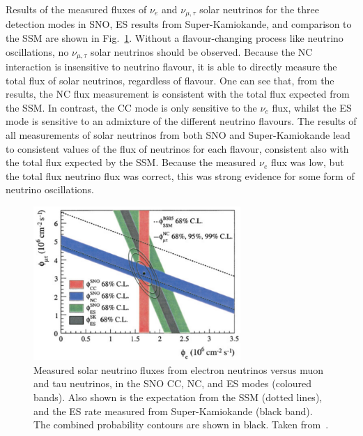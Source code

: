 Results of the measured fluxes of $\nu_{e}$ and $\nu_{\mu,\tau}$ solar neutrinos for the three detection modes in SNO, ES results from Super-Kamiokande, and comparison to the SSM are shown in Fig.~\ref{fig:sno_flux_results}. Without a flavour-changing process like neutrino oscillations, no $\nu_{\mu,\tau}$ solar neutrinos should be observed. Because the NC interaction is insensitive to neutrino flavour, it is able to directly measure the total flux of \beight{} solar neutrinos, regardless of flavour. One can see that, from the results, the NC flux measurement is consistent with the total flux expected from the SSM. In contrast, the CC mode is only sensitive to the $\nu_{e}$ flux, whilst the ES mode is sensitive to an admixture of the different neutrino flavours. The results of all measurements of solar neutrinos from both SNO and Super-Kamiokande lead to consistent values of the flux of \beight{} neutrinos for each flavour, consistent also with the total flux expected by the SSM. Because the measured $\nu_{e}$ flux was low, but the total flux neutrino flux was correct, this was strong evidence for some form of neutrino oscillations.

\begin{figure}
    \centering
    \includegraphics[width=0.7\textwidth]{1_NeutrinoTheory/Figs/sno_vs_ssm_comparison.png}
    \caption[Comparison of measured solar neutrino fluxes in the SNO CC, NC, and ES modes to the SSM]
    {Measured solar neutrino fluxes from electron neutrinos versus muon and tau neutrinos, in the SNO CC, NC, and ES modes (coloured bands). Also shown is the expectation from the SSM (dotted lines), and the ES rate measured from Super-Kamiokande (black band). The combined probability contours are shown in black. Taken from~\cite{aharmimElectronEnergySpectra2005}.}
    \label{fig:sno_flux_results}
\end{figure}

